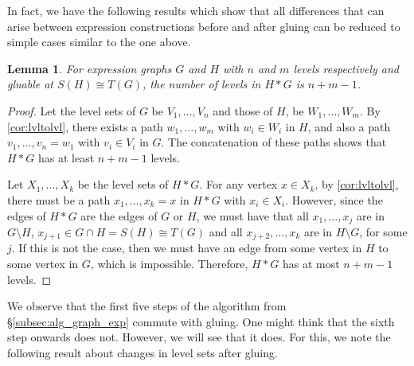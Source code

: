 \documentclass{amsart}
\numberwithin{thm}{section}
\newtheorem{lem}[thm]{Lemma}
\theoremstyle{definition}
\begin{document}
In fact, we have the following results which show that all differences that can
arise between expression constructions before and after gluing can be reduced to
simple cases similar to the one above.

\begin{lem}
For expression graphs $G$ and $H$ with $n$ and $m$ levels respectively and
gluable at $S(H) \cong T(G)$, the number of levels in $H * G$ is $n + m - 1$.
\end{lem}
\begin{proof}
Let the level sets of $G$ be $V_1, \dots, V_n$ and
those of $H$, be $W_1, \dots, W_m$. By \ref{cor:lvltolvl}, there exists a path
$w_1, \dots, w_m$ with $w_i \in W_i$ in $H$, and also a path
$v_1, \dots, v_n = w_1$ with $v_i \in V_i$ in $G$. The concatenation of these
paths shows that $H * G$ has at least $n + m - 1$ levels.

Let $X_1, \dots, X_k$ be the level sets of $H * G$. For any vertex
$x \in X_k$, by \ref{cor:lvltolvl}, there must be a path $x_1, \dots, x_k = x$
in $H * G$ with $x_i \in X_i$. However, since the edges of $H * G$ are the edges
of $G$ or $H$, we must have that all $x_1, \dots, x_{j}$ are in
$G \setminus H$, $x_{j + 1} \in G \cap H = S(H) \cong T(G)$ and all
$x_{j + 2}, \dots, x_k$ are in $H \setminus G$, for some $j$. If this is
not the case, then we must have an edge from some vertex in $H$ to some vertex
in $G$, which is impossible. Therefore, $H * G$ has at most $n + m - 1$ levels.
\end{proof}

We observe that the first five steps of the algorithm from
\S\ref{subsec:alg_graph_exp} commute with gluing. One might think that the sixth
step onwards does not. However, we will see that it does. For this, we note the
following result about changes in level sets after gluing.
\end{document}
